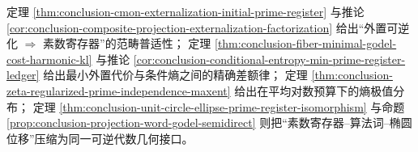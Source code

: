 \begin{remark}[三重对应的定量闭环]\label{rem:conclusion-godel-prime-ellipse-information-closure}
定理 \ref{thm:conclusion-cmon-externalization-initial-prime-register} 与推论 \ref{cor:conclusion-composite-projection-externalization-factorization}
给出“外置可逆化 \(\Rightarrow\) 素数寄存器”的范畴普适性；
定理 \ref{thm:conclusion-fiber-minimal-godel-cost-harmonic-kl} 与推论 \ref{cor:conclusion-conditional-entropy-min-prime-register-ledger}
给出最小外置代价与条件熵之间的精确差额律；
定理 \ref{thm:conclusion-zeta-regularized-prime-independence-maxent} 给出在平均对数预算下的熵极值分布；
定理 \ref{thm:conclusion-unit-circle-ellipse-prime-register-isomorphism} 与命题 \ref{prop:conclusion-projection-word-godel-semidirect}
则把“素数寄存器--算法词--椭圆位移”压缩为同一可逆代数几何接口。
\end{remark}
